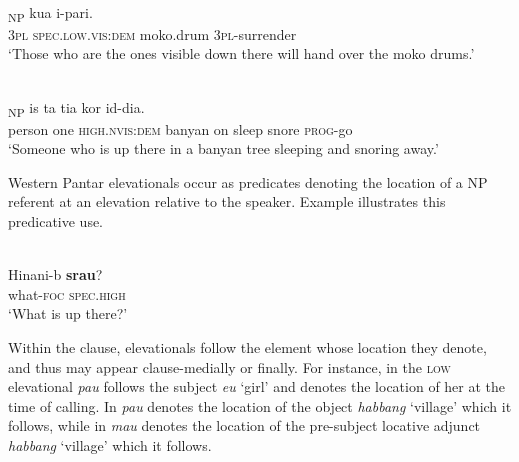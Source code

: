 \ea%
\label{ex:7:30}
 \\
\textsubscript{NP} kua{\ng}  i-pari{\ng}.\\
    \textsc{3pl} \textsc{spec.low.vis:dem} moko.drum  \textsc{3pl-}surrender\\
\glt `Those who are the ones visible down there will hand over the moko drums.'
\z



 
  



\ea%
\label{ex:7:31}
 \\
\textsubscript{NP} is   ta{\ng} ti{\textglotstop}a{\ng} kor  id-dia.\\
    person  one  \textsc{high.}\textsc{nvis:dem} banyan  on  sleep  snore  \textsc{prog}{}-go\\
\glt `Someone who is up there in a banyan tree sleeping and snoring away.'
\z

  
 

  

Western Pantar elevationals occur as predicates denoting the location of a NP referent at an elevation relative to the speaker. Example  illustrates this predicative use. 

 

\ea%
\label{ex:7:32}
 \\
\gll  Hinani-b  \textbf{{srau}}{?} \\
   what-\textsc{foc} \textsc {spec.high}  \\
\glt `What is up there?'  
\z

 

 

  

Within the clause, elevationals follow the element whose location they denote, and thus may appear clause-medially or finally. For instance, in  the \textsc{low} elevational \textit{pau} follows the subject \textit{eu} `girl' and denotes the location of her at the time of calling. In  \textit{pau} denotes the location of the object \textit{habbang} `village' which it follows, while in  \textit{mau} denotes the location of the pre-subject locative adjunct \textit{habbang} `village' which it follows.

